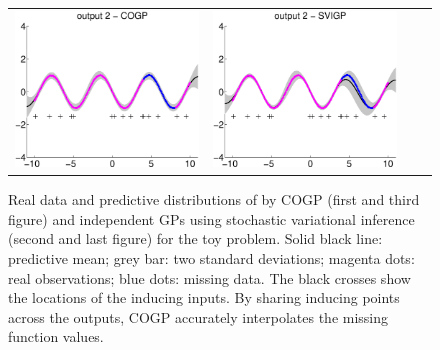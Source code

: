 \begin{figure}
\begin{tabular}{cccc}
\includegraphics[scale=0.2]{figures/toy-slfm-y2.eps} &
\includegraphics[scale=0.2]{figures/toy-svigp-y2.eps}
\end{tabular}
\caption{Real data and predictive distributions of by COGP (first and third figure) and independent GPs using stochastic variational inference (second and last figure) for the toy problem. Solid black line: predictive mean; grey bar: two standard deviations; magenta dots: real observations; blue dots: missing data. The black crosses show the locations of the inducing inputs. By sharing inducing points across the outputs, COGP accurately interpolates the missing function values.}
\label{fig:toy}
\end{figure}

